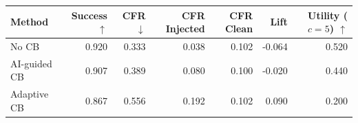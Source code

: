 \begin{tabular}{lrrrrrr}
\toprule
Method & Success $\uparrow$ & CFR $\downarrow$ & CFR Injected & CFR Clean & Lift & Utility ($c=5$) $\uparrow$ \\
\midrule
No CB & 0.920 & 0.333 & 0.038 & 0.102 & -0.064 & 0.520 \\
AI-guided CB & 0.907 & 0.389 & 0.080 & 0.100 & -0.020 & 0.440 \\
Adaptive CB & 0.867 & 0.556 & 0.192 & 0.102 & 0.090 & 0.200 \\
\bottomrule
\end{tabular}
